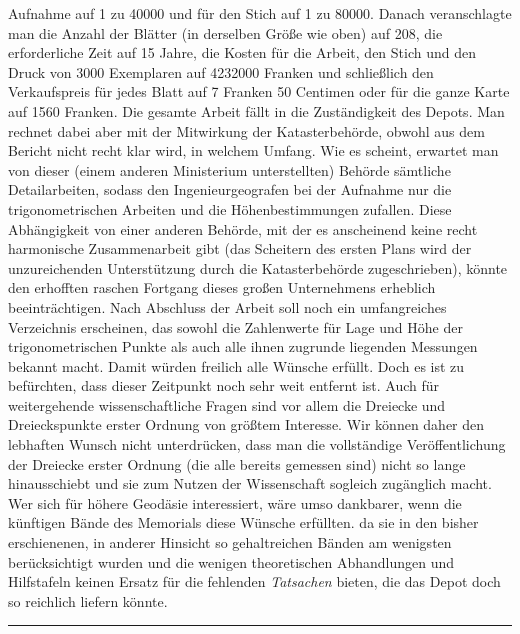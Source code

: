 %
Aufnahme auf 1 zu 40000 und für den Stich auf 1 zu 80000. Danach veranschlagte man die Anzahl der Blätter (in derselben Größe wie oben) auf 208, die erforderliche Zeit auf 15 Jahre, die Kosten für die Arbeit, den Stich und den Druck von 3000 Exemplaren auf 4232000 Franken und schließlich den Verkaufspreis für jedes Blatt auf 7 Franken 50 Centimen oder für die ganze Karte auf 1560 Franken. Die gesamte Arbeit fällt in die Zuständigkeit des Depots. Man rechnet dabei aber mit der Mitwirkung der Katasterbehörde, obwohl aus dem Bericht nicht recht klar wird, in welchem Umfang. Wie es scheint, erwartet man von dieser (einem anderen Ministerium unterstellten) Behörde sämtliche Detailarbeiten, sodass den Ingenieurgeografen bei der Aufnahme nur die trigonometrischen Arbeiten und die Höhenbestimmungen zufallen. Diese Abhängigkeit von einer anderen Behörde, mit der es anscheinend keine recht harmonische Zusammenarbeit gibt (das Scheitern des ersten Plans wird der unzureichenden Unterstützung durch die Katasterbehörde zugeschrieben), könnte den erhofften raschen Fortgang dieses großen Unternehmens erheblich beeinträchtigen. Nach Abschluss der Arbeit soll noch ein umfangreiches Verzeichnis erscheinen, das sowohl die Zahlenwerte für Lage und Höhe der trigonometrischen Punkte als auch alle ihnen zugrunde liegenden Messungen bekannt macht. Damit würden freilich alle Wünsche erfüllt. Doch es ist zu befürchten, dass dieser Zeitpunkt noch sehr weit entfernt ist. Auch für weitergehende wissenschaftliche Fragen sind vor allem die Dreiecke und Dreieckspunkte erster Ordnung von größtem Interesse. Wir können daher den lebhaften Wunsch nicht unterdrücken, dass man die vollständige Veröffentlichung der Dreiecke erster Ordnung (die alle bereits gemessen sind) nicht so lange hinausschiebt und sie zum Nutzen der Wissenschaft sogleich zugänglich macht. Wer sich für höhere Geodäsie interessiert, wäre umso dankbarer, wenn die künftigen Bände des Memorials diese Wünsche erfüllten. da sie in den bisher erschienenen, in anderer Hinsicht so gehaltreichen Bänden am wenigsten berücksichtigt wurden und die wenigen theoretischen Abhandlungen und Hilfstafeln keinen Ersatz für die fehlenden \textit{Tatsachen} bieten, die das Depot doch so reichlich liefern könnte.
\begin{center}\rule{.3\textwidth}{.3pt}\end{center}
